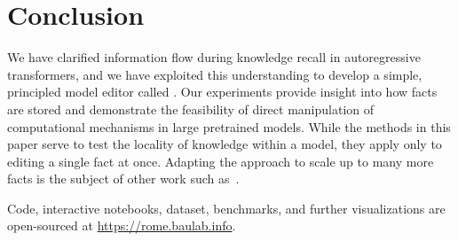 \section{Conclusion}

We have clarified information flow during knowledge recall in autoregressive transformers, and we have exploited this understanding to develop a simple, principled model editor called \method. Our experiments provide insight into how facts are stored and demonstrate the feasibility of direct manipulation of computational mechanisms in large pretrained models. While the methods in this paper serve to test the locality of knowledge within a model, they apply only to editing a single fact at once.  Adapting the approach to scale up to many more facts is the subject of other work such as~\citet*{meng2022memit}.

Code, interactive notebooks, dataset, benchmarks, and further visualizations are open-sourced at \url{https://rome.baulab.info}.
